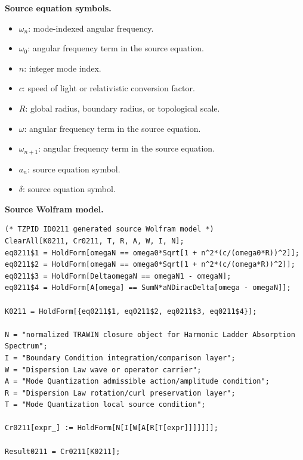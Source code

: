 \begin{minipage}[t]{0.49\linewidth}
\begingroup
\small
\raggedright
\textbf{Source equation symbols.}\par
\begin{itemize}[leftmargin=1.35em,itemsep=1pt,topsep=1pt,parsep=0pt]
    \item $\omega_n$: mode-indexed angular frequency.
    \item $\omega_0$: angular frequency term in the source equation.
    \item $n$: integer mode index.
    \item $c$: speed of light or relativistic conversion factor.
    \item $R$: global radius, boundary radius, or topological scale.
    \item $\omega$: angular frequency term in the source equation.
    \item $\omega_{n+1}$: angular frequency term in the source equation.
    \item $a_n$: source equation symbol.
    \item $\delta$: source equation symbol.
\end{itemize}
\endgroup
\end{minipage}\hfill
\begin{minipage}[t]{0.47\linewidth}
\begingroup
\scriptsize
\raggedright
\textbf{Source Wolfram model.}\par
\begin{Verbatim}[fontsize=\tiny,breaklines=true,breakanywhere=true]
(* TZPID ID0211 generated source Wolfram model *)
ClearAll[K0211, Cr0211, T, R, A, W, I, N];
eq0211$1 = HoldForm[omegaN == omega0*Sqrt[1 + n^2*(c/(omega0*R))^2]];
eq0211$2 = HoldForm[omegaN == omega0*Sqrt[1 + n^2*(c/(omega*R))^2]];
eq0211$3 = HoldForm[DeltaomegaN == omegaN1 - omegaN];
eq0211$4 = HoldForm[A[omega] == SumN*aNDiracDelta[omega - omegaN]];

K0211 = HoldForm[{eq0211$1, eq0211$2, eq0211$3, eq0211$4}];

N = "normalized TRAWIN closure object for Harmonic Ladder Absorption Spectrum";
I = "Boundary Condition integration/comparison layer";
W = "Dispersion Law wave or operator carrier";
A = "Mode Quantization admissible action/amplitude condition";
R = "Dispersion Law rotation/curl preservation layer";
T = "Mode Quantization local source condition";

Cr0211[expr_] := HoldForm[N[I[W[A[R[T[expr]]]]]]];

Result0211 = Cr0211[K0211];
\end{Verbatim}
\endgroup
\end{minipage}

